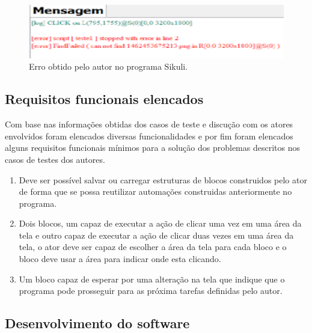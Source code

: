 \documentclass[tg]{mdtufsm}
\begin{document}
	\begin{figure}[!htb]
		{\centering
		\includegraphics[width=1.0\textwidth]{imagens/sikuli_error}
		\caption{Erro obtido pelo autor no programa Sikuli.}
		\label{fig:erroSikuli}}
	\end{figure}


    \subsection {Requisitos funcionais elencados}

    Com base nas informações obtidas dos casos de teste e discução com os atores envolvidos foram elencados diversas funcionalidades e por fim foram elencados alguns requisitos funcionais mínimos para a solução dos problemas descritos nos casos de testes dos autores.

    \begin{enumerate}

		\item Deve ser possível salvar ou carregar estruturas de blocos construidos pelo ator de forma que se possa reutilizar automações construidas anteriormente no programa.

		\item Dois blocos, um capaz de executar a ação de clicar uma vez em uma área da tela e outro capaz de executar a ação de clicar duas vezes em uma área da tela, o ator deve ser capaz de escolher a área da tela para cada bloco e o bloco deve usar a área para indicar onde esta clicando.

		\item Um bloco capaz de esperar por uma alteração na tela que indique que o programa pode prosseguir para as próxima tarefas definidas pelo autor.


	\end{enumerate}

    \subsection {Desenvolvimento do software}
\end{document}
